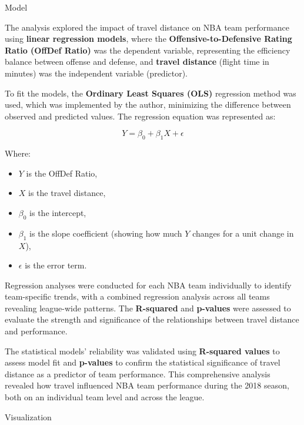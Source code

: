 \documentclass[final]{beamer}
\newlength{\colwidth}
\begin{document}
\begin{frame}[t]
\begin{columns}[t]
\begin{column}{\colwidth}
  \begin{block}{Model}

    The analysis explored the impact of travel distance on NBA team performance using \textbf{linear regression models}, where the \textbf{Offensive-to-Defensive Rating Ratio (OffDef Ratio)} was the dependent variable, representing the efficiency balance between offense and defense, and \textbf{travel distance} (flight time in minutes) was the independent variable (predictor). 

To fit the models, the \textbf{Ordinary Least Squares (OLS)} regression method was used, which was implemented by the author, minimizing the difference between observed and predicted values. The regression equation was represented as:

\[
Y = \beta_0 + \beta_1 X + \epsilon
\]

Where:
\begin{itemize}
    \item \(Y\) is the OffDef Ratio,
    \item \(X\) is the travel distance,
    \item \(\beta_0\) is the intercept,
    \item \(\beta_1\) is the slope coefficient (showing how much \(Y\) changes for a unit change in \(X\)),
    \item \(\epsilon\) is the error term.
\end{itemize}

Regression analyses were conducted for each NBA team individually to identify team-specific trends, with a combined regression analysis across all teams revealing league-wide patterns. The \textbf{R-squared} and \textbf{p-values} were assessed to evaluate the strength and significance of the relationships between travel distance and performance.


The statistical models' reliability was validated using \textbf{R-squared values} to assess model fit and \textbf{p-values} to confirm the statistical significance of travel distance as a predictor of team performance. This comprehensive analysis revealed how travel influenced NBA team performance during the 2018 season, both on an individual team level and across the league.

  \end{block}

\begin{block}{Visualization}


\end{block}
\end{column}
\end{columns}
\end{frame}
\end{document}
